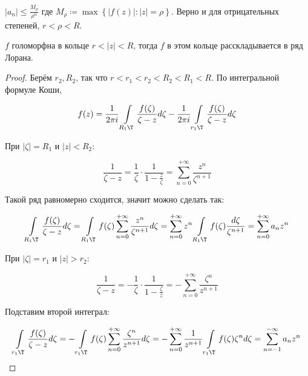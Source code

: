 \begin{consequence}

    $|a_n| \le \frac{M_\rho}{\rho^n}$
    где $M_\rho \coloneqq \max \left\{|f(z)| : |z| = \rho\right\}$.
    Верно и для отрицательных степеней,
    $r < \rho < R$.
\end{consequence}

\begin{theorem}[Лоран]

    $f$ голоморфна в кольце $r < |z| < R$,
    тогда $f$ в этом кольце расскладывается в ряд Лорана.
\end{theorem}

\begin{proof}
    Берём $r_2, R_2$, так что $r < r_1 < r_2 < R_2 < R_1 < R$.
    По интегральной формуле Коши,

    \[
        f(z) = \frac{1}{2\pi i} \int\limits_{R_1\T} \frac{f(\zeta)}
        {\zeta - z} d\zeta - \frac{1}{2\pi i}
        \int\limits_{r_1\T} \frac{f(\zeta)}{\zeta - z}d\zeta
    \]

    При $|\zeta| = R_1$ и $|z| < R_2$:

    \[
        \frac{1}{\zeta - z} =
        \frac{1}{\zeta}\cdot \frac{1}{1-\frac{z}{\zeta}}
        = \sum\limits_{n=0}^{+\infty} \frac{z^n}{\zeta^{n+1}}
    \]

    Такой ряд равномерно сходится, значит можно сделать так:

    \[
        \int\limits_{R_1\T} \frac{f(\zeta)}{\zeta - z}d\zeta =
        \int\limits_{R_1\T} f(\zeta) \sum\limits_{n=0}^{+\infty}
        \frac{z^n}{\zeta^{n+1}}d\zeta =
        \sum\limits_{n=0}^{+\infty} z^n
        \int\limits_{R_1\T} f(\zeta) \frac{d\zeta}{\zeta^{n+1}}
        = \sum\limits_{n=0}^{+\infty} a_nz^n
    \]

    При $|\zeta| = r_1$ и $|z| > r_2$:

    \[
        \frac{1}{\zeta - z} =
        -\frac{1}{\zeta}\cdot \frac{1}{1-\frac{\zeta}{z}}
        = -\sum\limits_{n=0}^{+\infty} \frac{\zeta^n}{z^{n+1}}
    \]

    Подставим второй интеграл:

    \[
        \int\limits_{r_1\T} \frac{f(\zeta)}{\zeta-z}d\zeta
        = -\int\limits_{r_1\T} f(\zeta) \sum\limits_{n=0}^{+\infty}
        \frac{\zeta^n}{z^{n+1}} d\zeta
        = -\sum\limits_{n=0}^{+\infty} \frac{1}{z^{n+1}}
        \int\limits_{r_1\T} f(\zeta)\zeta^n d\zeta
        = \sum\limits_{n=-1}^{-\infty} a_nz^n
    \]
\end{proof}

